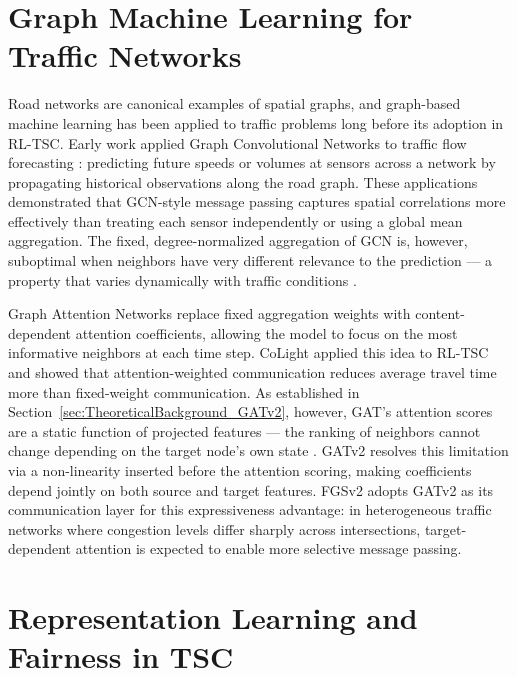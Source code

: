 \section{Graph Machine Learning for Traffic Networks}
\label{sec:LiteratureReview_GraphMLVariants}

Road networks are canonical examples of spatial graphs, and graph-based machine learning has been applied to traffic problems long before its adoption in RL-TSC. Early work applied Graph Convolutional Networks \citep{kipf2017semi} to traffic flow forecasting \citep{yu2018spatio}: predicting future speeds or volumes at sensors across a network by propagating historical observations along the road graph. These applications demonstrated that GCN-style message passing captures spatial correlations more effectively than treating each sensor independently or using a global mean aggregation. The fixed, degree-normalized aggregation of GCN is, however, suboptimal when neighbors have very different relevance to the prediction — a property that varies dynamically with traffic conditions \citep{velickovic2018graph}.

Graph Attention Networks \citep{velickovic2018graph} replace fixed aggregation weights with content-dependent attention coefficients, allowing the model to focus on the most informative neighbors at each time step. CoLight \citep{wei2019colight} applied this idea to RL-TSC and showed that attention-weighted communication reduces average travel time more than fixed-weight communication. As established in Section~\ref{sec:TheoreticalBackground_GATv2}, however, GAT's attention scores are a static function of projected features — the ranking of neighbors cannot change depending on the target node's own state \citep{brody2022how}. GATv2 resolves this limitation via a non-linearity inserted before the attention scoring, making coefficients depend jointly on both source and target features. FGSv2 adopts GATv2 as its communication layer for this expressiveness advantage: in heterogeneous traffic networks where congestion levels differ sharply across intersections, target-dependent attention is expected to enable more selective message passing.

\section{Representation Learning and Fairness in TSC}
\label{sec:LiteratureReview_FairnessRepresentation}

